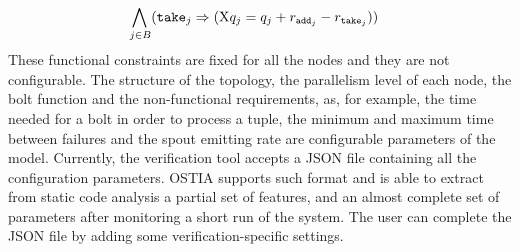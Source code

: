 \begin{align}
%
\bigwedge_{
	\begin{subarray}{c}
	\,j \in B
	\end{subarray}
} &( \ta{j}{}  \Rightarrow (\aX q_j = q_j + \ra{j} - \rt{j} )) \label{formula:2}
%
\end{align}
These functional constraints are fixed for all the nodes and they are not configurable.
The structure of the topology, the parallelism level of each node, the bolt function and the non-functional requirements, as, for example, the time needed for a bolt in order to process a tuple, the minimum and maximum time between failures and the spout emitting rate are configurable parameters of the model.
Currently, the verification tool accepts %
a JSON file containing all the configuration parameters.
OSTIA supports such format and is able to extract from static code analysis a partial set of features, and an almost complete set of parameters after monitoring a short run of the system. The user can complete the JSON file by adding some verification-specific settings.


